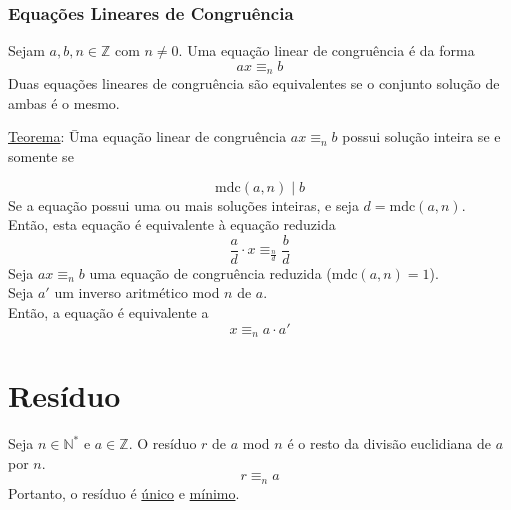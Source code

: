 \documentclass{article}
\begin{document}
\subsubsection{Equações Lineares de Congruência}
Sejam $a, b, n \in \mathbb{Z}$ com $n \neq 0$. Uma equação linear de congruência é da forma
\[ ax \equiv_n b \]
Duas equações lineares de congruência são equivalentes se o conjunto solução de ambas é o mesmo.\\
\begin{tabbing}
  \uline{Teorema}: \= Uma equação linear de congruência $ax \equiv_n b$ possui solução inteira se e somente se \\[5pt]
  \>\begin{minipage}{\textwidth}
    \[ \text{mdc}(a,n) \mid b \]
    Se a equação possui uma ou mais soluções inteiras, e seja $d = \text{mdc}(a,n)$. \\
    Então, esta equação é equivalente à equação reduzida
    \[ \frac{a}{d} \cdot x \equiv_{\frac{n}{d}} \frac{b}{d} \]
    Seja $ax \equiv_n b$ uma equação de congruência reduzida ($\text{mdc}(a, n) = 1$). \\
    Seja $a'$ um inverso aritmético mod $n$ de $a$. \\
    Então, a equação é equivalente a
    \[ x \equiv_n a \cdot a' \]
  \end{minipage}
\end{tabbing}



\section{Resíduo}
Seja $n \in \mathbb{N}^*$ e $a \in \mathbb{Z}$. O resíduo $r$ de $a$ mod $n$ é o resto da divisão euclidiana de $a$ por $n$.
\[ r \equiv_n a \]
Portanto, o resíduo é \uline{único} e \uline{mínimo}.

\end{document}
